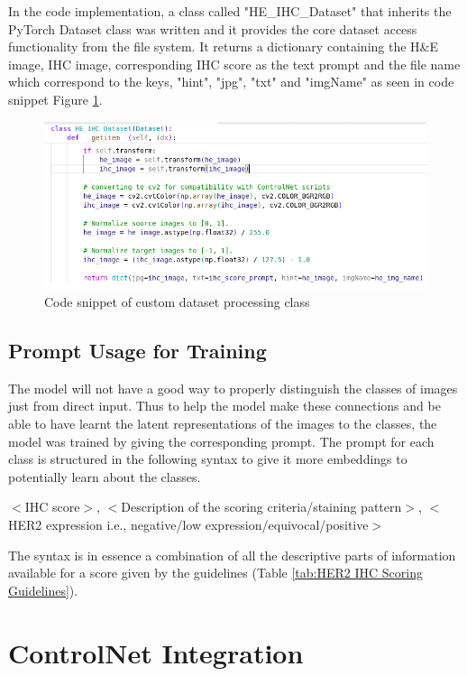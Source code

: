 In the code implementation, a class called "HE\_IHC\_Dataset" that inherits the PyTorch Dataset class was written and it provides the core dataset access functionality from the file system. It returns a dictionary containing the H\&E image, IHC image, corresponding IHC score as the text prompt and the file name which correspond to the keys, "hint", "jpg", "txt" and "imgName" as seen in code snippet Figure \ref{fig:he-ihc-dataset-class}.  
\begin{figure}[ht]
    \centering
    \includegraphics[width=1\linewidth]{4_ResearchMethodology/figures/he_ihc_dataset_class_return_snippet.png}
    \caption[Custom dataset processing class]{Code snippet of custom dataset processing class}
    \label{fig:he-ihc-dataset-class}
\end{figure}
\subsection{Prompt Usage for Training}

The model will not have a good way to properly distinguish the classes of images just from direct input. Thus to help the model make these connections and be able to have learnt the latent representations of the images to the classes, the model was trained by giving the corresponding prompt. The prompt for each class is structured in the following syntax to give it more embeddings to potentially learn about the classes.

$<$IHC score$>$, $<$Description of the scoring criteria/staining pattern$>$, $<$HER2 expression i.e., negative/low expression/equivocal/positive$>$

The syntax is in essence a combination of all the descriptive parts of information available for a score given by the guidelines (Table \ref{tab:HER2 IHC Scoring Guidelines}).

\section{ControlNet Integration}

